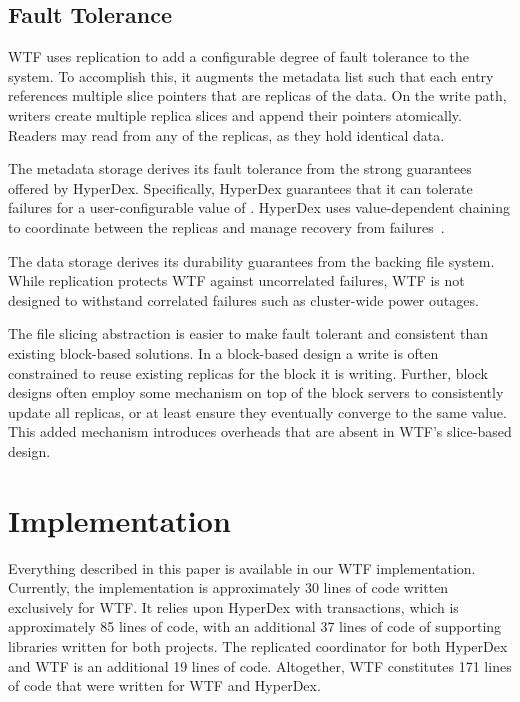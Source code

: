 \documentclass[twocolumn,10pt,letterpaper]{article}
\begin{document}
\subsection{Fault Tolerance}

WTF uses replication to add a configurable degree of fault tolerance to the
system.  To accomplish this, it augments the metadata list such that each entry
references multiple slice pointers that are replicas of the data.  On the write
path, writers create multiple replica slices and append their pointers
atomically.  Readers may read from any of the replicas, as they hold identical
data.

The metadata storage derives its fault tolerance from the strong guarantees
offered by HyperDex.  Specifically, HyperDex guarantees that it can tolerate 
failures for a user-configurable value of .  HyperDex uses value-dependent
chaining to coordinate between the replicas and manage recovery from
failures~\cite{hyperdex}.

The data storage derives its durability guarantees from the backing file system.
While replication protects WTF against uncorrelated failures, WTF is not designed 
to withstand correlated failures such as cluster-wide power outages.

The file slicing abstraction is easier to make fault tolerant and consistent
than existing block-based solutions.  In a block-based design a write is often
constrained to reuse existing replicas for the block it is writing.  Further,
block designs often employ some mechanism on top of the block servers to
consistently update all replicas, or at least ensure they eventually converge to
the same value.  This added mechanism introduces overheads that are absent in
WTF's slice-based design.

\section{Implementation}

Everything described in this paper is available in our WTF implementation.
Currently, the implementation is approximately \unit{30}{\kilo} lines of code
written exclusively for WTF.  It relies upon HyperDex with transactions, which
is approximately \unit{85}{\kilo} lines of code, with an additional
\unit{37}{\kilo} lines of code of supporting libraries written for both
projects.  The replicated coordinator for both HyperDex and WTF is an additional
\unit{19}{\kilo} lines of code.  Altogether, WTF constitutes \unit{171}{\kilo}
lines of code that were written for WTF and HyperDex.
\end{document}
